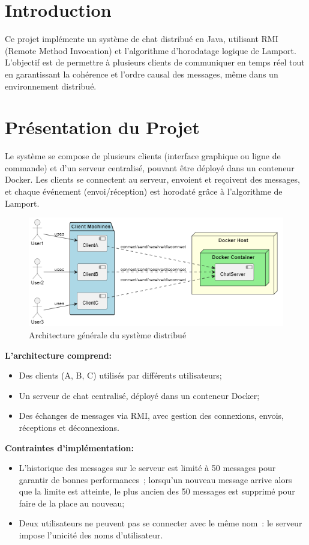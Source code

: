 \documentclass[a4paper,12pt]{article}
\begin{document}
\section{Introduction}
Ce projet implémente un système de chat distribué en Java, utilisant RMI (Remote Method Invocation) et l'algorithme d'horodatage logique de Lamport. L'objectif est de permettre à plusieurs clients de communiquer en temps réel tout en garantissant la cohérence et l'ordre causal des messages, même dans un environnement distribué.

\section{Présentation du Projet}
Le système se compose de plusieurs clients (interface graphique ou ligne de commande) et d'un serveur centralisé, pouvant être déployé dans un conteneur Docker. Les clients se connectent au serveur, envoient et reçoivent des messages, et chaque événement (envoi/réception) est horodaté grâce à l'algorithme de Lamport.

\begin{figure}[ht!]
    \centering
    \includegraphics[width=1\textwidth]{architecture.png}
    \caption{Architecture générale du système distribué}
\end{figure}

\textbf{L'architecture comprend:}
\begin{itemize}
    \item Des clients (A, B, C) utilisés par différents utilisateurs;
    \item Un serveur de chat centralisé, déployé dans un conteneur Docker;
    \item Des échanges de messages via RMI, avec gestion des connexions, envois, réceptions et déconnexions.
\end{itemize}

\textbf{Contraintes d'implémentation:}
\begin{itemize}
    \item L'historique des messages sur le serveur est limité à 50 messages pour garantir de bonnes performances~; lorsqu'un nouveau message arrive alors que la limite est atteinte, le plus ancien des 50 messages est supprimé pour faire de la place au nouveau;
    \item Deux utilisateurs ne peuvent pas se connecter avec le même nom~: le serveur impose l'unicité des noms d'utilisateur.
\end{itemize}
\end{document}
